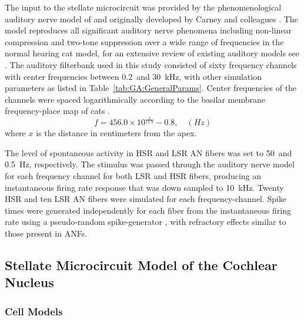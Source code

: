 The input to the stellate microcircuit was provided by the
phenomenological auditory nerve model of \citet{HeinzZhangEtAl:2001}
and originally developed by Carney and colleagues
\citep{Carney:1993,ZhangCarney:2001}. The model reproduces all
significant auditory nerve phenomena including non-linear compression
and two-tone suppression over a wide range of frequencies in the
normal hearing cat model, for an extensive review of existing auditory
models see \citet{Lopez-Poveda:2005}. The auditory filterbank used in
this study consisted of sixty frequency channels with center
frequencies between 0.2~and 30~kHz, with other simulation parameters
as listed in Table~\ref{tab:GA:GeneralParams}. Center frequencies of
the channels were spaced logarithmically according to the basilar
membrane frequency-place map of cats \citep[See Table ]{Greenwood:1990}. 
\begin{equation} \label{eq:GA:Greenwood} 
f=456.0\times 10^{\frac{x}{11.9} } -0.8, \quad (Hz)
\end{equation}
\noindent where $x$ is the distance in centimeters from the apex.
\smallskip{}

The level
of spontaneous activity in HSR and LSR AN fibers was set to 50~and
0.5~Hz, respectively. The stimulus was passed through the auditory
nerve model for each frequency channel for both LSR and HSR fibers,
producing an instantaneous firing rate response that was down sampled
to 10~kHz. Twenty HSR and ten LSR AN fibers were simulated for each
frequency-channel. Spike times were generated independently for each
fiber from the instantaneous firing rate using a pseudo-random
spike-generator \citep{JacksonCarney:2005}, with refractory effects
similar to those present in ANFs.

\subsection{Stellate Microcircuit Model of the Cochlear Nucleus}\label{sec:GA:stell-micr-model}

\subsubsection{Cell Models}\label{sec:GA:cell-models}

